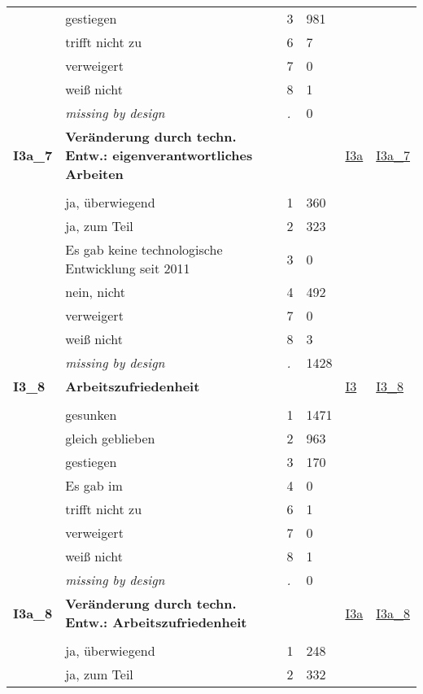 \begin{longtable}{| L{2.45cm} | L{6cm} | C{1.5cm} | R{1cm} | C{2.25cm} | C{2.25cm} |}
   & gestiegen & 3 & 981 &  &  \\ 
   & trifft nicht zu & 6 & 7 &  &  \\ 
   & verweigert & 7 & 0 &  &  \\ 
   & weiß nicht & 8 & 1 &  &  \\ 
   & \textit{missing by design} & \textit{.} & 0 &  &  \\ 
   \midrule
\textbf{I3a\_7}\label{var:I3a:7} & \textbf{Veränderung durch techn. Entw.: eigenverantwortliches Arbeiten} &  &  & \hyperref[I3a]{I3a} & \hyperref[var:suf:I3a:7]{I3a\_7} \\ 
   &  &  &  &  &  \\ 
   & ja, überwiegend & 1 & 360 &  &  \\ 
   & ja, zum Teil & 2 & 323 &  &  \\ 
   & Es gab keine technologische Entwicklung seit 2011 & 3 & 0 &  &  \\ 
   & nein, nicht & 4 & 492 &  &  \\ 
   & verweigert & 7 & 0 &  &  \\ 
   & weiß nicht & 8 & 3 &  &  \\ 
   & \textit{missing by design} & \textit{.} & 1428 &  &  \\ 
   \midrule
\textbf{I3\_8}\label{var:I3:8} & \textbf{Arbeitszufriedenheit} &  &  & \hyperref[I3]{I3} & \hyperref[var:suf:I3:8]{I3\_8} \\ 
   &  &  &  &  &  \\ 
   & gesunken & 1 & 1471 &  &  \\ 
   & gleich geblieben & 2 & 963 &  &  \\ 
   & gestiegen & 3 & 170 &  &  \\ 
   & Es gab im & 4 & 0 &  &  \\ 
   & trifft nicht zu & 6 & 1 &  &  \\ 
   & verweigert & 7 & 0 &  &  \\ 
   & weiß nicht & 8 & 1 &  &  \\ 
   & \textit{missing by design} & \textit{.} & 0 &  &  \\ 
   \midrule
\textbf{I3a\_8}\label{var:I3a:8} & \textbf{Veränderung durch techn. Entw.: Arbeitszufriedenheit} &  &  & \hyperref[I3a]{I3a} & \hyperref[var:suf:I3a:8]{I3a\_8} \\ 
   &  &  &  &  &  \\ 
   & ja, überwiegend & 1 & 248 &  &  \\ 
   & ja, zum Teil & 2 & 332 &  &  \\ 

\end{longtable}
